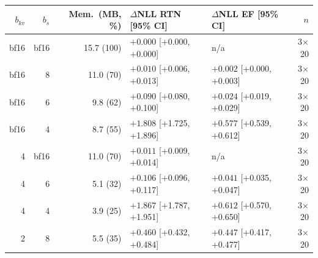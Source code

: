 \begin{tabular}{rrrllr}
\toprule
$b_{kv}$ & $b_s$ & Mem.\ (MB, \%) & $\Delta$NLL RTN [95\% CI] & $\Delta$NLL EF [95\% CI] & $n$ \\
\midrule
bf16 & bf16 & 15.7 (100) & $+0.000$ [+0.000, +0.000] & n/a & 3$\times$20 \\
bf16 & 8 & 11.0 (70) & $+0.010$ [+0.006, +0.013] & $+0.002$ [+0.000, +0.003] & 3$\times$20 \\
bf16 & 6 & 9.8 (62) & $+0.090$ [+0.080, +0.100] & $+0.024$ [+0.019, +0.029] & 3$\times$20 \\
bf16 & 4 & 8.7 (55) & $+1.808$ [+1.725, +1.896] & $+0.577$ [+0.539, +0.612] & 3$\times$20 \\
4 & bf16 & 11.0 (70) & $+0.011$ [+0.009, +0.014] & n/a & 3$\times$20 \\
4 & 6 & 5.1 (32) & $+0.106$ [+0.096, +0.117] & $+0.041$ [+0.035, +0.047] & 3$\times$20 \\
4 & 4 & 3.9 (25) & $+1.867$ [+1.787, +1.951] & $+0.612$ [+0.570, +0.650] & 3$\times$20 \\
2 & 8 & 5.5 (35) & $+0.460$ [+0.432, +0.484] & $+0.447$ [+0.417, +0.477] & 3$\times$20 \\
\bottomrule
\end{tabular}
